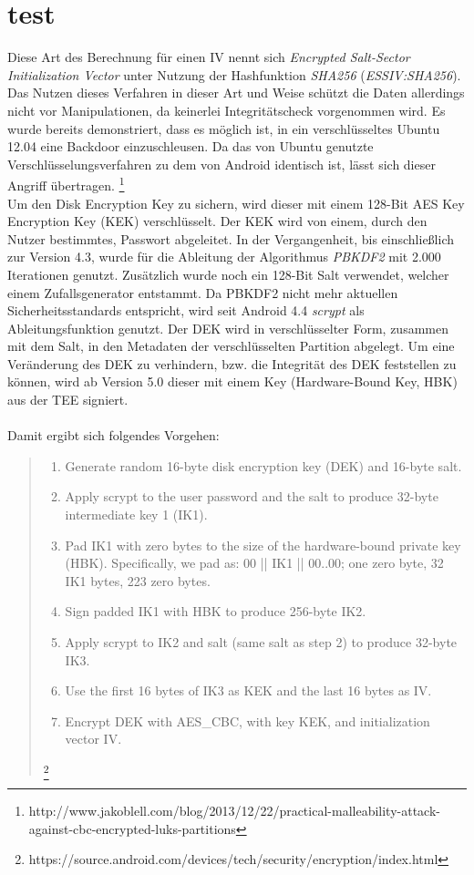 \chapter{test}
	Diese Art des Berechnung für einen IV nennt sich \textit{Encrypted Salt-Sector Initialization Vector} unter Nutzung der Hashfunktion \textit{SHA256} (\textit{ESSIV:SHA256}).\cite[S. 259]{Elenkov2014} Das Nutzen dieses Verfahren in dieser Art und Weise schützt die Daten allerdings nicht vor Manipulationen, da keinerlei Integritätscheck vorgenommen wird. Es wurde bereits demonstriert, dass es möglich ist, in ein verschlüsseltes Ubuntu 12.04 eine Backdoor einzuschleusen. Da das von Ubuntu genutzte Verschlüsselungsverfahren zu dem von Android identisch ist, lässt sich dieser Angriff übertragen. \footnote{http://www.jakoblell.com/blog/2013/12/22/practical-malleability-attack-against-cbc-encrypted-luks-partitions}\\
	Um den Disk Encryption Key zu sichern, wird dieser mit einem 128-Bit AES Key Encryption Key (KEK) verschlüsselt. Der KEK wird von einem, durch den Nutzer bestimmtes, Passwort abgeleitet. In der Vergangenheit, bis einschließlich zur Version 4.3, wurde für die Ableitung der Algorithmus \textit{PBKDF2} mit 2.000 Iterationen genutzt. Zusätzlich wurde noch ein 128-Bit Salt verwendet, welcher einem Zufallsgenerator entstammt. Da PBKDF2 nicht mehr aktuellen Sicherheitsstandards entspricht, wird seit Android 4.4 \textit{scrypt} als Ableitungsfunktion genutzt. Der DEK wird in verschlüsselter Form, zusammen mit dem Salt, in den Metadaten der verschlüsselten Partition abgelegt. Um eine Veränderung des DEK zu verhindern, bzw. die Integrität des DEK feststellen zu können, wird ab Version 5.0 dieser mit einem Key (Hardware-Bound Key, HBK) aus der TEE signiert. \\\\
	Damit ergibt sich folgendes Vorgehen:
	\begin{quote}
		\begin{enumerate}
		   \item Generate random 16-byte disk encryption key (DEK) and 16-byte salt.
		   \item Apply scrypt to the user password and the salt to produce 32-byte intermediate key 1 (IK1).
		   \item Pad IK1 with zero bytes to the size of the hardware-bound private key (HBK). Specifically, we pad as: 00 || IK1 || 00..00; one zero byte, 32 IK1 bytes, 223 zero bytes.
		   \item Sign padded IK1 with HBK to produce 256-byte IK2.
		   \item Apply scrypt to IK2 and salt (same salt as step 2) to produce 32-byte IK3.
		   \item Use the first 16 bytes of IK3 as KEK and the last 16 bytes as IV.
		   \item Encrypt DEK with AES\_CBC, with key KEK, and initialization vector IV. 
	   \end{enumerate}
	   \footnote{https://source.android.com/devices/tech/security/encryption/index.html}
	\end{quote}
